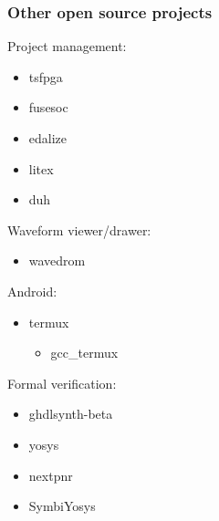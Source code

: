 \documentclass{beamer}
\begin{document}
\begin{frame}
\frametitle{Other open source projects}
\begin{minipage}[t]{.495\linewidth}
Project management:
\begin{itemize}
  \item tsfpga
  \href{https://gitlab.com/truestream/tsfpga}{\faGit} \href{https://truestream.gitlab.io/tsfpga/}{\faBook}
  \href{https://pypi.org/project/tsfpga/}{\faCode}

  \item fusesoc
  \href{https://github.com/olofk/fusesoc}{\faGithub}
  \href{https://fusesoc.rtfd.io/}{\faBook}
  \href{https://pypi.org/project/fusesoc/}{\faCode}

  \item edalize
  \href{https://github.com/olofk/edalize}{\faGithub}
  \href{https://edalize.rtfd.io}{\faBook}
  \href{https://pypi.org/project/edalize/}{\faCode}

  \item litex
  \href{https://github.com/enjoy-digital/litex}{\faGithub}

  \item duh
  \href{https://github.com/sifive/duh}{\faGithub}
\end{itemize}
\vspace{1em}

Waveform viewer/drawer:
\begin{itemize}
  \item wavedrom
  \href{https://github.com/wavedrom/wavedrom}{\faGithub}
  \href{https://wavedrom.com/}{\faGlobe}
\end{itemize}
\end{minipage}
\begin{minipage}[t]{.49\linewidth}
Android:
\begin{itemize}
  \item termux \href{https://termux.com/}{\faGlobe} \href{https://github.com/termux}{\faGithub}
  \begin{itemize}
      \item gcc\_termux \href{https://github.com/its-pointless/gcc_termux}{\faGithub}
  \end{itemize}
\end{itemize}
\vspace{1em}

Formal verification:
\begin{itemize}
  \item ghdlsynth-beta
  \href{https://github.com/tgingold/ghdlsynth-beta}{\faGithub}

  \item yosys
  \href{https://github.com/YosysHQ/yosys}{\faGithub}
  \href{http://www.clifford.at/yosys/}{\faGlobe}

  \item nextpnr
  \href{https://github.com/YosysHQ/nextpnr}{\faGithub}

  \item SymbiYosys
  \href{https://github.com/YosysHQ/SymbiYosys}{\faGithub}
  \href{https://symbiyosys.rtfd.io}{\faBook}
\end{itemize}
\end{minipage}
\end{frame}
\end{document}
